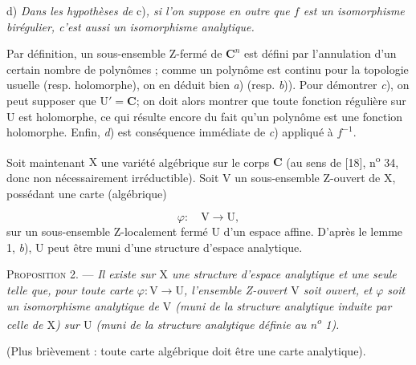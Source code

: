 d) \textit{Dans les hypothèses de} c)\textit{, si l'on suppose en outre que $f$ est un isomorphisme birégulier, c'est aussi un isomorphisme analytique.}



Par définition, un sous-ensemble Z-fermé de $\mathbf{C}^n$ est défini par l'annulation d'un certain nombre de polynômes ; comme un polynôme est continu pour la topologie usuelle (resp. holomorphe), on en déduit bien \textit{a}) (resp. \textit{b})). Pour démontrer \textit{c}), on peut supposer que $\mathrm{U}' = \mathbf{C}$; on doit alors montrer que toute fonction régulière sur $\mathrm{U}$ est holomorphe, ce qui résulte encore du fait qu'un polynôme est une fonction holomorphe. Enfin, \textit{d}) est conséquence immédiate de \textit{c}) appliqué à $f^{-1}$.

Soit maintenant $\mathrm{X}$ une variété algébrique sur le corps $\mathbf{C}$ (au sens de [18], n\textsuperscript{o} 34, donc non nécessairement irréductible). Soit $\mathrm{V}$ un sous-ensemble Z-ouvert de $\mathrm{X}$, possédant une carte (algébrique)

\begin{equation*}
\varphi : \quad \mathrm{V} \to \mathrm{U},
\end{equation*}
sur un sous-ensemble Z-localement fermé $\mathrm{U}$ d'un espace affine. D'après le lemme 1, \textit{b}), $\mathrm{U}$ peut être muni d'une structure d'espace analytique.

\textsc{Proposition} 2. --- \textit{Il existe sur $\mathrm{X}$ une structure d'espace analytique et une seule telle que, pour toute carte $\varphi : \mathrm{V} \to \mathrm{U}$, l'ensemble Z-ouvert $\mathrm{V}$ soit ouvert, et $\varphi$ soit un isomorphisme analytique de $\mathrm{V}$ (muni de la structure analytique induite par celle de $\mathrm{X}$) sur $\mathrm{U}$ (muni de la structure analytique définie au n\textsuperscript{o} 1).}

(Plus brièvement : toute carte algébrique doit être une carte analytique).

